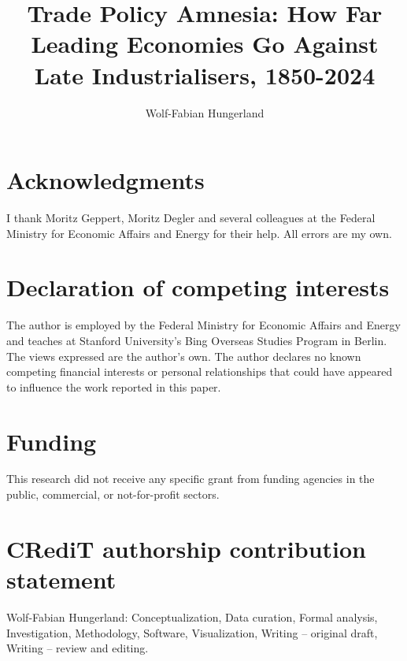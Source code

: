 \documentclass[preprint,authoryear,12pt]{elsarticle}
\begin{document}
\begin{frontmatter}
\title{Trade Policy Amnesia: How Far Leading Economies Go Against Late Industrialisers, 1850-2024}
\author[a,b]{Wolf-Fabian Hungerland}
\end{frontmatter}

\section*{Acknowledgments}
I thank Moritz Geppert, Moritz Degler and several colleagues at the Federal Ministry for Economic Affairs and Energy for their help. All errors are my own.

\section*{Declaration of competing interests}
The author is employed by the Federal Ministry for Economic Affairs and Energy and teaches at Stanford University's Bing Overseas Studies Program in Berlin. The views expressed are the author's own. The author declares no known competing financial interests or personal relationships that could have appeared to influence the work reported in this paper.

\section*{Funding}
This research did not receive any specific grant from funding agencies in the public, commercial, or not-for-profit sectors.

\section*{CRediT authorship contribution statement}
Wolf-Fabian Hungerland: Conceptualization, Data curation, Formal analysis, Investigation, Methodology, Software, Visualization, Writing -- original draft, Writing -- review and editing.
\end{document}
